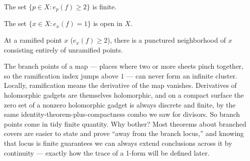\begin{lemma}
\label{lem:branch-locus-finite}
The set \(\{p\in X : e_p(f)\ge 2\}\) is finite.
\notready
\end{lemma}

\begin{lemma}
\label{lem:unramified-set-open}
The set \(\{x\in X : e_x(f)=1\}\) is open in \(X\).
\leanok
\end{lemma}

\begin{lemma}
\label{lem:ramified-isolated}
At a ramified point \(x\) (\(e_x(f)\ge 2\)), there is a punctured
neighborhood of \(x\) consisting entirely of unramified points.
\leanok
\end{lemma}

\begin{layman}
The branch points of a map — places where two or more sheets pinch
together, so the ramification index jumps above \(1\) — can never form
an infinite cluster. Locally, ramification means the derivative of the
map vanishes. Derivatives of holomorphic gadgets are themselves
holomorphic, and on a compact surface the zero set of a nonzero
holomorphic gadget is always discrete and finite, by the same
identity-theorem-plus-compactness combo we saw for divisors. So branch
points come in tidy finite quantity. Why bother? Most theorems about
branched covers are easier to state and prove ``away from the branch
locus,'' and knowing that locus is finite guarantees we can always
extend conclusions across it by continuity — exactly how the trace of a
1-form will be defined later.
\end{layman}


